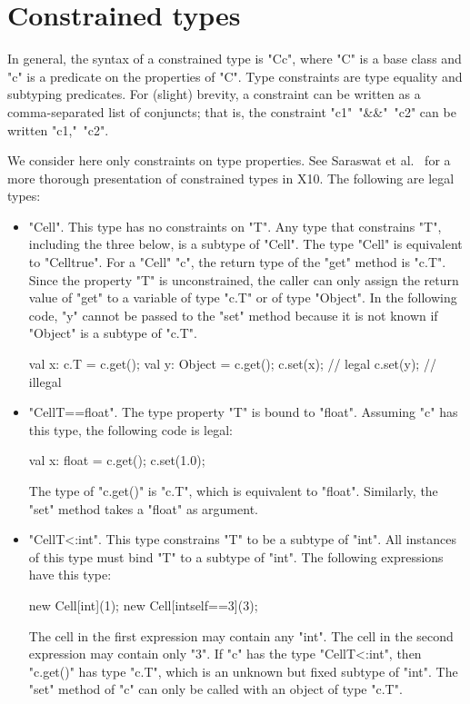 \documentclass{llncs}
\begin{document}
\section{Constrained types}

In general, the syntax of a constrained type is
\xcd"C{c}", where \xcd"C" is a base class and
\xcd"c" is a predicate on the properties of \xcd"C".
Type constraints are type equality and subtyping predicates.
For (slight) brevity, a constraint can be written as
a comma-separated list of conjuncts; that is, the constraint
\xcd"c1"~\xcd"&&"~\xcd"c2" can be written
\xcd"c1,"~\xcd"c2".

We consider here only constraints on type properties. 
See Saraswat et al.~\cite{constrained-types} for a more thorough
presentation of constrained types in X10.
The following are legal types:
\begin{itemize}
\item \xcd"Cell".  This type has no constraints on \xcd"T".
Any type that constrains \xcd"T", including the three below,
is a subtype of \xcd"Cell".  The type \xcd"Cell" is equivalent to
\xcd"Cell{true}".
%
For a \xcd"Cell" \xcd"c", the return type of the \xcd"get" method 
is \xcd"c.T".  
Since the property \xcd"T" is unconstrained,  
the caller can only assign the return value of \xcd"get"
to a variable of type \xcd"c.T" or of type \xcd"Object".
In the following code, \xcd"y" cannot be passed to the \xcd"set" method
because it is not known if \xcd"Object" is a subtype of \xcd"c.T".
\begin{xten}
val x: c.T = c.get();
val y: Object = c.get();
c.set(x); // legal
c.set(y); // illegal
\end{xten}

\item \xcd"Cell{T==float}".
The type property \xcd"T" is bound to \xcd"float".
Assuming \xcd"c" has this type, the following code is legal:
\begin{xten}
val x: float = c.get();
c.set(1.0);
\end{xten}
The type of \xcd"c.get()" is \xcd"c.T", which is equivalent to
\xcd"float".
Similarly, the \xcd"set" method takes a \xcd"float" as argument.

\item \xcd"Cell{T<:int}".
This type constrains \xcd"T" to be a subtype of \xcd"int".
All instances of this type must bind \xcd"T" to a subtype of \xcd"int".
The following expressions have this type:
\begin{xten}
new Cell[int](1);
new Cell[int{self==3}](3);
\end{xten}
The cell in the first expression may contain any \xcd"int".
The cell in the second expression may contain only \xcd"3".
%
If \xcd"c" has the type \xcd"Cell{T<:int}",
then \xcd"c.get()" has type \xcd"c.T", which is an unknown but
fixed subtype of \xcd"int".  The \xcd"set" method of \xcd"c" can
only be called with an object of type \xcd"c.T".


\end{itemize}
\end{document}
